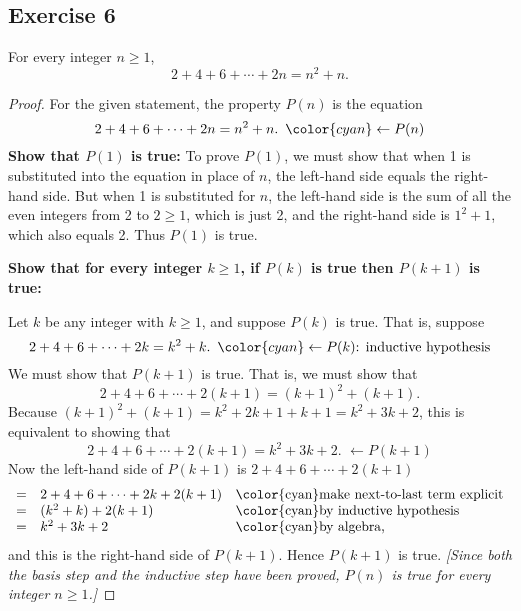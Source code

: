 \documentclass[14pt]{extarticle}
\newcommand{\from}{\leftarrow}
\newcommand{\cy}{\color{cyan}}
\begin{document}
\subsection{Exercise 6}
For every integer $n \geq 1$,
\[
    2 + 4 + 6 + \cdots + 2n = n^2 + n.
\]
\begin{proof}
    For the given statement, the property $P(n)$ is the equation
    \[
        2 + 4 + 6 + \cdots + 2n = n^2 + n. \,\,\, {\cy \from P(n)}
    \]
    {\bf Show that $P(1)$ is true:} To prove $P(1)$, we must show that when 1 is substituted into the equation in place of $n$, the left-hand side equals the right-hand side. But when 1 is substituted for $n$, the left-hand side is the sum of all the even integers from 2 to $2 \geq 1$, which is just 2, and the right-hand side is $1^2 + 1$, which also equals 2. Thus $P(1)$ is true.

        {\bf Show that for every integer $k \geq 1$, if $P(k)$ is true then $P(k + 1)$ is true:}

    Let $k$ be any integer with $k \geq 1$, and suppose $P(k)$ is true. That is, suppose
    \[
        2 + 4 + 6 + \cdots + 2k = k^2 + k. \,\,\, {\cy \from P(k) \text{: inductive hypothesis}}
    \]
    We must show that $P(k + 1)$ is true. That is, we must show that
    \[
        2 + 4 + 6 + \cdots + 2(k + 1) = (k + 1)^2 + (k + 1).
    \]
    Because $(k + 1)^2 + (k + 1) = k^2 + 2k + 1 + k + 1 =
        k^2 + 3k + 2$, this is equivalent to showing that
    \[
        2 + 4 + 6 + \cdots + 2(k + 1) = k^2 + 3k + 2. \,\, \from P(k + 1)
    \]
    Now the left-hand side of $P(k + 1)$ is $2 + 4 + 6 + \cdots + 2(k + 1)$
    \[
        \begin{array}{lll}
            = & 2 + 4 + 6 + \cdots + 2k + 2(k + 1) & \text{\cy make next-to-last term explicit} \\
            = & (k^2+k) + 2(k+1)                   & \text{\cy by inductive hypothesis}         \\
            = & k^2 + 3k + 2                       & \text{\cy by algebra,}
        \end{array}
    \]
    and this is the right-hand side of $P(k + 1)$. Hence $P(k + 1)$ is true. {\it [Since both the basis step and the inductive step have been proved, $P(n)$ is true for every integer $n \geq 1$.]}
\end{proof}
\end{document}
